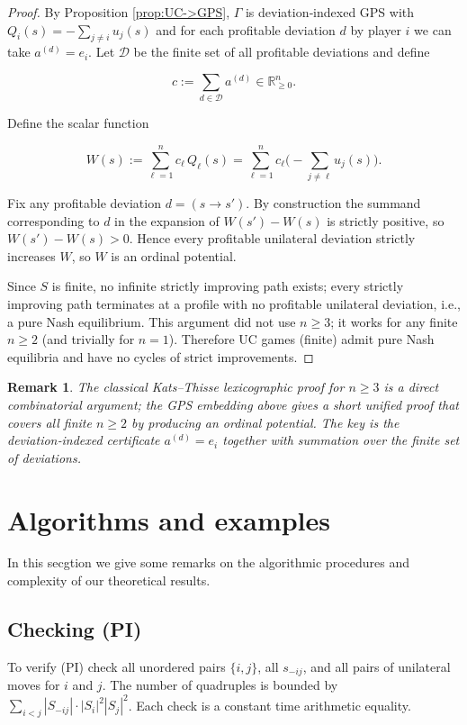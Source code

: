 \documentclass[11pt]{article}
\newtheorem{remark}[theorem]{Remark}
\begin{document}
\begin{proof}
By Proposition \ref{prop:UC->GPS}, $\Gamma$ is deviation‑indexed GPS with $Q_i(s)=-\sum_{j\ne i}u_j(s)$ and for each profitable deviation $d$ by player $i$ we can take $a^{(d)}=e_i$. Let $\mathcal D$ be the finite set of all profitable deviations and define


\[
c:=\sum_{d\in\mathcal D} a^{(d)}\in\mathbb R^n_{\ge0}.
\]


Define the scalar function


\[
W(s):=\sum_{\ell=1}^n c_\ell\,Q_\ell(s)=\sum_{\ell=1}^n c_\ell\Big(-\sum_{j\ne \ell} u_j(s)\Big).
\]


Fix any profitable deviation $d=(s\to s')$. By construction the summand corresponding to $d$ in the expansion of $W(s')-W(s)$ is strictly positive, so $W(s')-W(s)>0$. Hence every profitable unilateral deviation strictly increases $W$, so $W$ is an ordinal potential.

Since $S$ is finite, no infinite strictly improving path exists; every strictly improving path terminates at a profile with no profitable unilateral deviation, i.e., a pure Nash equilibrium. This argument did not use $n\ge3$; it works for any finite $n\ge2$ (and trivially for $n=1$). Therefore UC games (finite) admit pure Nash equilibria and have no cycles of strict improvements.
\end{proof}

\begin{remark}
The classical Kats–Thisse lexicographic proof for $n\ge3$ is a direct combinatorial argument; the GPS embedding above gives a short unified proof that covers all finite $n\ge2$ by producing an ordinal potential. The key is the deviation‑indexed certificate $a^{(d)}=e_i$ together with summation over the finite set of deviations.
\end{remark}



\section{Algorithms and examples}
In this secgtion we give some remarks on the algorithmic procedures and complexity of our theoretical results.

\subsection{Checking (PI)}
To verify (PI) check all unordered pairs \(\{i,j\}\), all \(s_{-ij}\), and all
pairs of unilateral moves for \(i\) and \(j\). The number of quadruples is
bounded by \(\sum_{i<j} |S_{-ij}|\cdot |S_i|^2 |S_j|^2\). Each check is a
constant time arithmetic equality.
\end{document}
